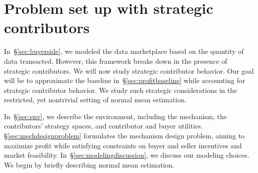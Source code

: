 \section{Problem set up with strategic contributors}
\label{sec:setup}

In~\S\ref{sec:buyerside}, we modeled the data marketplace based on the quantity of data transacted.
However, this framework breaks down in the presence of strategic contributors. 
We will now study strategic contributor behavior. 
Our goal will be to approximate the baseline in~\S\ref{sec:profitbaseline} while accounting for strategic contributor behavior. 
We study such strategic considerations in the restricted, yet nontrivial setting of normal mean estimation.



In~\S\ref{sec:env}, we describe the environment, including the mechanism, the contributors' strategy spaces, and contributor and buyer utilities.
\S\ref{sec:mechdesignproblem} formulates the mechanism design problem, aiming to maximize profit while satisfying constraints on buyer and seller incentives and market feasibility.  
In~\S\ref{sec:modelingdiscussion}, we discuss our modeling choices.  
We begin by briefly describing normal mean estimation.  





